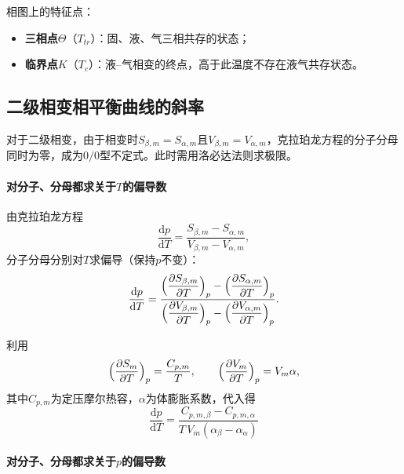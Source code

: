 \documentclass[UTF8]{ctexart}
\theoremstyle{definition}
\begin{document}
相图上的特征点：
\begin{itemize}
\item \textbf{三相点}$\Theta$（$T_{tr}$）：固、液、气三相共存的状态；
\item \textbf{临界点}$K$（$T_c$）：液--气相变的终点，高于此温度不存在液气共存状态。
\end{itemize}


\subsection{二级相变相平衡曲线的斜率}

对于二级相变，由于相变时$S_{\beta,m}=S_{\alpha,m}$且$V_{\beta,m}=V_{\alpha,m}$，克拉珀龙方程的分子分母同时为零，成为$0/0$型不定式。此时需用洛必达法则求极限。

\paragraph{对分子、分母都求关于$T$的偏导数}

由克拉珀龙方程
\begin{equation}
\frac{\mathrm{d}p}{\mathrm{d}T}
= \frac{S_{\beta,m}-S_{\alpha,m}}{V_{\beta,m}-V_{\alpha,m}},
\end{equation}
分子分母分别对$T$求偏导（保持$p$不变）：
\begin{equation}
\frac{\mathrm{d}p}{\mathrm{d}T}
= \frac{\displaystyle\Bigl(\frac{\partial S_{\beta,m}}{\partial T}\Bigr)_p-\Bigl(\frac{\partial S_{\alpha,m}}{\partial T}\Bigr)_p}
{\displaystyle\Bigl(\frac{\partial V_{\beta,m}}{\partial T}\Bigr)_p-\Bigl(\frac{\partial V_{\alpha,m}}{\partial T}\Bigr)_p}.
\end{equation}

利用
\begin{equation}
\Bigl(\frac{\partial S_m}{\partial T}\Bigr)_p = \frac{C_{p,m}}{T},\qquad
\Bigl(\frac{\partial V_m}{\partial T}\Bigr)_p = V_m\alpha,
\end{equation}
其中$C_{p,m}$为定压摩尔热容，$\alpha$为体膨胀系数，代入得
\begin{equation}
\boxed{\frac{\mathrm{d}p}{\mathrm{d}T}
= \frac{C_{p,m,\beta}-C_{p,m,\alpha}}{T\,V_m(\alpha_\beta-\alpha_\alpha)}}
\end{equation}

\paragraph{对分子、分母都求关于$p$的偏导数}
\end{document}
